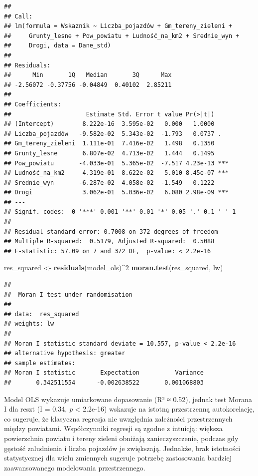 \documentclass[
  11pt,
]{article}
\newenvironment{Shaded}{\begin{snugshade}}{\end{snugshade}}
\newcommand{\DecValTok}[1]{\textcolor[rgb]{0.00,0.00,0.81}{#1}}
\newcommand{\FunctionTok}[1]{\textcolor[rgb]{0.13,0.29,0.53}{\textbf{#1}}}
\newcommand{\NormalTok}[1]{#1}
\newcommand{\OtherTok}[1]{\textcolor[rgb]{0.56,0.35,0.01}{#1}}
\newcommand{\SpecialCharTok}[1]{\textcolor[rgb]{0.81,0.36,0.00}{\textbf{#1}}}
\begin{document}
\begin{verbatim}
## 
## Call:
## lm(formula = Wskaznik ~ Liczba_pojazdów + Gm_tereny_zieleni + 
##     Grunty_lesne + Pow_powiatu + Ludność_na_km2 + Srednie_wyn + 
##     Drogi, data = Dane_std)
## 
## Residuals:
##      Min       1Q   Median       3Q      Max 
## -2.56072 -0.37756 -0.04849  0.40102  2.85211 
## 
## Coefficients:
##                     Estimate Std. Error t value Pr(>|t|)    
## (Intercept)        8.222e-16  3.595e-02   0.000   1.0000    
## Liczba_pojazdów   -9.582e-02  5.343e-02  -1.793   0.0737 .  
## Gm_tereny_zieleni  1.111e-01  7.416e-02   1.498   0.1350    
## Grunty_lesne       6.807e-02  4.713e-02   1.444   0.1495    
## Pow_powiatu       -4.033e-01  5.365e-02  -7.517 4.23e-13 ***
## Ludność_na_km2     4.319e-01  8.622e-02   5.010 8.45e-07 ***
## Srednie_wyn       -6.287e-02  4.058e-02  -1.549   0.1222    
## Drogi              3.062e-01  5.036e-02   6.080 2.98e-09 ***
## ---
## Signif. codes:  0 '***' 0.001 '**' 0.01 '*' 0.05 '.' 0.1 ' ' 1
## 
## Residual standard error: 0.7008 on 372 degrees of freedom
## Multiple R-squared:  0.5179, Adjusted R-squared:  0.5088 
## F-statistic: 57.09 on 7 and 372 DF,  p-value: < 2.2e-16
\end{verbatim}

\begin{Shaded}
\begin{Highlighting}[]
\NormalTok{res\_squared }\OtherTok{\textless{}{-}} \FunctionTok{residuals}\NormalTok{(model\_ols)}\SpecialCharTok{\^{}}\DecValTok{2}
\FunctionTok{moran.test}\NormalTok{(res\_squared, lw)}
\end{Highlighting}
\end{Shaded}

\begin{verbatim}
## 
##  Moran I test under randomisation
## 
## data:  res_squared  
## weights: lw    
## 
## Moran I statistic standard deviate = 10.557, p-value < 2.2e-16
## alternative hypothesis: greater
## sample estimates:
## Moran I statistic       Expectation          Variance 
##       0.342511554      -0.002638522       0.001068803
\end{verbatim}

Model OLS wykazuje umiarkowane dopasowanie (R² ≈ 0.52), jednak test
Morana I dla reszt (I = 0.34, \emph{p} \textless{} 2.2e‑16) wskazuje na
istotną przestrzenną autokorelację, co sugeruje, że klasyczna regresja
nie uwzględnia zależności przestrzennych między powiatami. Współczynniki
regresji są zgodne z intuicją: większa powierzchnia powiatu i tereny
zieleni obniżają zanieczyszczenie, podczas gdy gęstość zaludnienia i
liczba pojazdów je zwiększają. Jednakże, brak istotności statystycznej
dla wielu zmiennych sugeruje potrzebę zastosowania bardziej
zaawansowanego modelowania przestrzennego.
\end{document}
